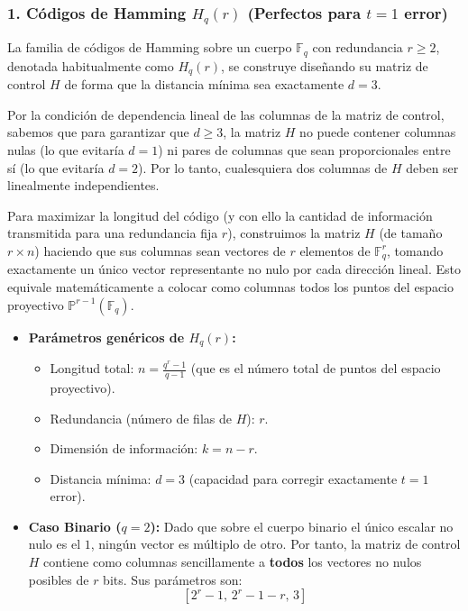 \documentclass{article}
\begin{document}
\subsubsection{1. Códigos de Hamming $H_q(r)$ (Perfectos para $t=1$ error)}

La familia de códigos de Hamming sobre un cuerpo $\mathbb{F}_q$ con redundancia $r \ge 2$, denotada habitualmente como $H_q(r)$, se construye diseñando su matriz de control $H$ de forma que la distancia mínima sea exactamente $d=3$. 

Por la condición de dependencia lineal de las columnas de la matriz de control, sabemos que para garantizar que $d \ge 3$, la matriz $H$ no puede contener columnas nulas (lo que evitaría $d=1$) ni pares de columnas que sean proporcionales entre sí (lo que evitaría $d=2$). Por lo tanto, cualesquiera dos columnas de $H$ deben ser linealmente independientes.

Para maximizar la longitud del código (y con ello la cantidad de información transmitida para una redundancia fija $r$), construimos la matriz $H$ (de tamaño $r \times n$) haciendo que sus columnas sean vectores de $r$ elementos de $\mathbb{F}_q^r$, tomando exactamente un único vector representante no nulo por cada dirección lineal. Esto equivale matemáticamente a colocar como columnas todos los puntos del espacio proyectivo $\mathbb{P}^{r-1}(\mathbb{F}_q)$.

\begin{itemize}
    \item \textbf{Parámetros genéricos de $H_q(r)$:} 
    \begin{itemize}
        \item Longitud total: $n = \frac{q^r-1}{q-1}$ (que es el número total de puntos del espacio proyectivo).
        \item Redundancia (número de filas de $H$): $r$.
        \item Dimensión de información: $k = n - r$.
        \item Distancia mínima: $d = 3$ (capacidad para corregir exactamente $t = 1$ error).
    \end{itemize}
    \item \textbf{Caso Binario ($q=2$):} Dado que sobre el cuerpo binario el único escalar no nulo es el $1$, ningún vector es múltiplo de otro. Por tanto, la matriz de control $H$ contiene como columnas sencillamente a \textbf{todos} los vectores no nulos posibles de $r$ bits. Sus parámetros son:
    \[ [2^r-1, \, 2^r-1-r, \, 3] \]
\end{itemize}
\end{document}
